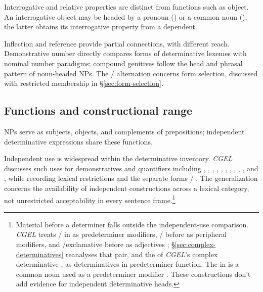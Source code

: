 \documentclass[12pt]{article}
\begin{document}
Interrogative and relative properties are distinct from functions such as object. An interrogative object may be headed by a pronoun () or a common noun (); the latter obtains its interrogative property from a dependent.

Inflection and reference provide partial connections, with different reach. Demonstrative number directly compares forms of determinative lexemes with nominal number paradigms; compound genitives follow the head and phrasal pattern of noun-headed NPs. The /\allowbreak{} alternation concerns form selection, discussed with restricted membership in §\ref{sec:form-selection}.

\subsection{Functions and constructional range}\label{sec:independent}

NPs serve as subjects, objects, and complements of prepositions; independent determinative expressions share these functions.

Independent use is widespread within the determinative inventory. \textit{CGEL} discusses such uses for demonstratives and quantifiers including , , , , , , , , , , and , while recording lexical restrictions and the separate forms / \citep[371--372, 410--424]{huddleston2002}. The generalization concerns the availability of independent constructions across a lexical category, not unrestricted acceptability in every sentence frame.\footnote{Material before a determiner falls outside the independent-use comparison. \textit{CGEL} treats / in  as predeterminer modifiers, / before  as peripheral modifiers, and /exclamative  before  as adjectives \citep[433--437]{huddleston2002}; §\ref{sec:complex-determinatives} reanalyses that pair, and the  of \textit{CGEL}'s complex determinative  \citep[394]{huddleston2002}, as determinatives in predeterminer function. The  in  is a common noun used as a predeterminer modifier \citep[434]{huddleston2002}. These constructions don't add evidence for independent determinative heads.}
\end{document}
